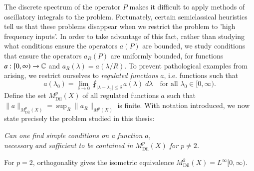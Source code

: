 The discrete spectrum of the operator $P$ makes it difficult to apply methods of oscillatory integrals to the problem. Fortunately, certain semiclassical heuristics tell us that these problems disappear when we restrict the problem to 'high frequency inputs'. In order to take advantage of this fact, rather than studying what conditions ensure the operators $a(P)$ are bounded, we study conditions that ensure the operators $a_R(P)$ are uniformly bounded, for functions $a: [0,\infty) \to \operatorname{\mathbb{C}}$ and $a_R(\lambda) = a(\lambda/R)$. %
To prevent pathological examples from arising, we restrict ourselves to \emph{regulated functions} $a$, i.e. functions such that
%
\begin{equation}
  a(\lambda_0) = \lim_{\delta \to 0} \fint_{|\lambda - \lambda_0| \leq \delta} a(\lambda)\; d\lambda \quad \text{for all $\lambda_0 \in [0,\infty)$}.
\end{equation}
%
%
%
Define the set $M^p_{\text{Dil}}(X)$ of all regulated functions $a$ such that $\| a \|_{M^p_{\text{Dil}}(X)} = \sup_R \| a_R \|_{M^p(X)}$ is finite. With notation introduced, we now state precisely the problem studied in this thesis:
\begin{changemargin}{2cm}{2cm}
\begin{center}
  \emph{Can one find simple conditions on a function $a$,\\
  necessary and sufficient to be contained in $M^p_{\text{Dil}}(X)$ for $p \neq 2$.}
\end{center}
\end{changemargin}
%
For $p = 2$, orthogonality gives the isometric equivalence $M^2_{\text{Dil}}(X) = L^\infty[0,\infty)$.

